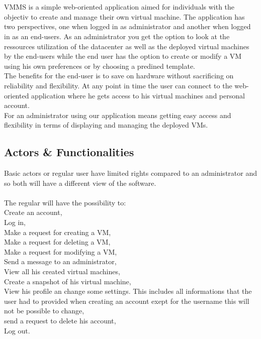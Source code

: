 \section{\mysystemname}

VMMS is a simple web-oriented application aimed for individuals with the
objectiv to create and manage their own virtual machine. The application    
has two perspectives, one when logged in as administrator and another when
logged in as an end-users. As an administrator you get the option to look at
the ressources utilization of the datacenter as well as the deployed virtual
machines by the end-users while the end user has the option to create or modify 
a VM using his own preferences or by choosing a predined template.\\The benefits
for the end-user is to save on hardware without sacrificing on reliability and 
flexibility. At any point in time the user can connect to the web-oriented
application where he gets access to his virtual machines and personal
account.\\For an administrator using our application means getting easy access
and flexibility in terms of displaying and managing the deployed VMs.

\subsection{Actors \& Functionalities}
Basic actors or regular user have limited rights compared to an administrator
and so both will have a different view of the software.\\\\The regular will have
the possibility to:\\

Create an account,\\
Log in,\\
Make a request for creating a VM,\\
Make a request for deleting a VM,\\
Make a request for modifying a VM,\\
Send a message to an administrator,\\
View all his created virtual machines,\\
Create a snapshot of his virtual machine,\\
View his profile an change some settings. This includes all informations that
the user had to provided when creating an account exept for the username this
will not be possible to change,\\
send a request to delete his account,\\
Log out.\\\\





